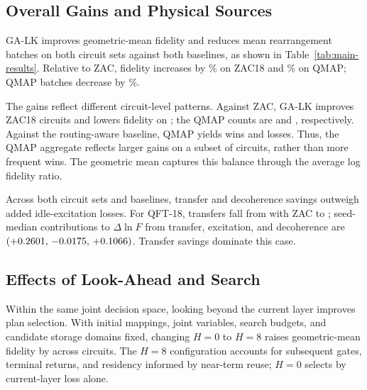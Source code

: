 \subsection{Overall Gains and Physical Sources}

GA-LK improves geometric-mean fidelity and reduces mean rearrangement batches on both circuit sets against both baselines, as shown in Table~\ref{tab:main-results}. Relative to ZAC, fidelity increases by \GAMainZACVsZACFidelityGain\% on ZAC18 and \GAMainQMAPVsZACFidelityGain\% on QMAP; QMAP batches decrease by \GAMainQMAPVsZACBatchReduction\%.



The gains reflect different circuit-level patterns. Against ZAC, GA-LK improves \GAMainZACVsZACWins{} ZAC18 circuits and lowers fidelity on \GAMainZACVsZACLosses{}; the QMAP counts are \GAMainQMAPVsZACWins{} and \GAMainQMAPVsZACLosses{}, respectively. Against the routing-aware baseline, QMAP yields \GAMainQMAPVsICCADWins{} wins and \GAMainQMAPVsICCADLosses{} losses. Thus, the QMAP aggregate reflects larger gains on a subset of circuits, rather than more frequent wins. The geometric mean captures this balance through the average log fidelity ratio.

Across both circuit sets and baselines, transfer and decoherence savings outweigh added idle-excitation losses. For QFT-18, transfers fall from \GAMainMechanismQFTBaseTransfers{} with ZAC to \GAMainMechanismQFTGATransfers{}; seed-median contributions to $\Delta\ln F$ from transfer, excitation, and decoherence are \mbox{$(+0.2601,\,-0.0175,\,+0.1066)$}. Transfer savings dominate this case.

\subsection{Effects of Look-Ahead and Search}
\label{sec:ablation}

Within the same joint decision space, looking beyond the current layer improves plan selection. With initial mappings, joint variables, search budgets, and candidate storage domains fixed, changing $H=0$ to $H=8$ raises geometric-mean fidelity by  across \AblationHN{} circuits. The $H=8$ configuration accounts for subsequent gates, terminal returns, and residency informed by near-term reuse; $H=0$ selects by current-layer loss alone.

